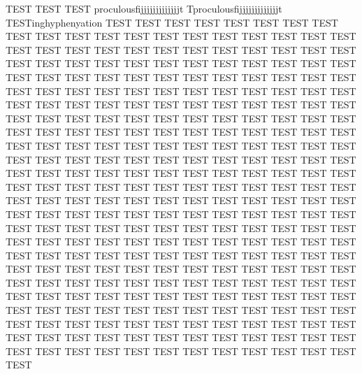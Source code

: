 \documentclass{article}
\begin{document}
TEST TEST TEST proculousfijjjjjjjjjjjjjt Tproculousfijjjjjjjjjjjjjt 
TESTinghyphenyation TEST TEST TEST TEST TEST TEST TEST TEST TEST TEST TEST TEST TEST TEST TEST TEST TEST TEST TEST TEST TEST TEST TEST TEST TEST TEST TEST TEST TEST TEST TEST TEST TEST TEST TEST TEST TEST TEST TEST TEST TEST TEST TEST TEST TEST TEST TEST TEST TEST TEST TEST TEST TEST TEST TEST TEST TEST TEST TEST TEST TEST TEST TEST TEST TEST TEST TEST TEST TEST TEST TEST TEST TEST TEST TEST TEST TEST TEST TEST TEST TEST TEST TEST TEST TEST TEST TEST TEST TEST TEST TEST TEST TEST TEST TEST TEST TEST TEST TEST TEST TEST TEST TEST TEST TEST TEST TEST TEST TEST TEST TEST TEST TEST TEST TEST TEST TEST TEST TEST TEST TEST TEST TEST TEST TEST TEST TEST TEST TEST TEST TEST TEST TEST TEST TEST TEST TEST TEST TEST TEST TEST TEST TEST TEST TEST TEST TEST TEST TEST TEST TEST TEST TEST TEST TEST TEST TEST TEST TEST TEST TEST TEST TEST TEST TEST TEST TEST TEST TEST TEST TEST TEST TEST TEST TEST TEST TEST TEST TEST TEST TEST TEST TEST TEST TEST TEST TEST TEST TEST TEST TEST TEST TEST TEST TEST TEST TEST TEST TEST TEST TEST TEST TEST TEST TEST TEST TEST TEST TEST TEST TEST TEST TEST TEST TEST TEST TEST TEST TEST TEST TEST TEST TEST TEST TEST TEST TEST TEST TEST TEST TEST TEST TEST TEST TEST TEST TEST TEST TEST TEST TEST TEST TEST TEST TEST TEST TEST TEST TEST TEST TEST TEST TEST TEST TEST TEST TEST TEST TEST TEST TEST TEST TEST TEST TEST TEST TEST TEST TEST TEST TEST TEST TEST TEST TEST TEST TEST TEST TEST TEST TEST TEST TEST TEST TEST TEST TEST TEST TEST TEST TEST TEST TEST TEST TEST TEST TEST 
\end{document}
